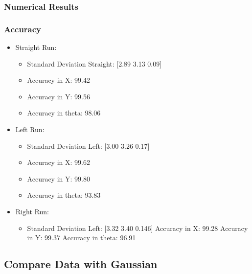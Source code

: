 \documentclass[10pt,a4paper]{article}
\begin{document}
						\subsubsection{Numerical Results}
							
							
							
							
						\subsubsection{Accuracy}
						\begin{itemize}
							\item Straight Run:
							\begin{itemize}
								\item Standard Deviation Straight: [2.89 3.13 0.09]
								\item Accuracy in X:  99.42
								\item Accuracy in Y:  99.56
								\item Accuracy in theta:  98.06								
							\end{itemize}
							
							\item Left Run:
							\begin{itemize}
								\item Standard Deviation Left: [3.00 3.26 0.17]
								\item Accuracy in X:  99.62
								\item Accuracy in Y:  99.80
								\item Accuracy in theta:  93.83								
							\end{itemize}
							
							\item Right Run:
							\begin{itemize}
								\item Standard Deviation Left: [3.32 3.40 0.146]
								Accuracy in X:  99.28
								Accuracy in Y:  99.37
								Accuracy in theta:  96.91								
							\end{itemize}
						
						\end{itemize}
					\subsection{Compare Data with Gaussian}
%					
%					
					
\end{document}
